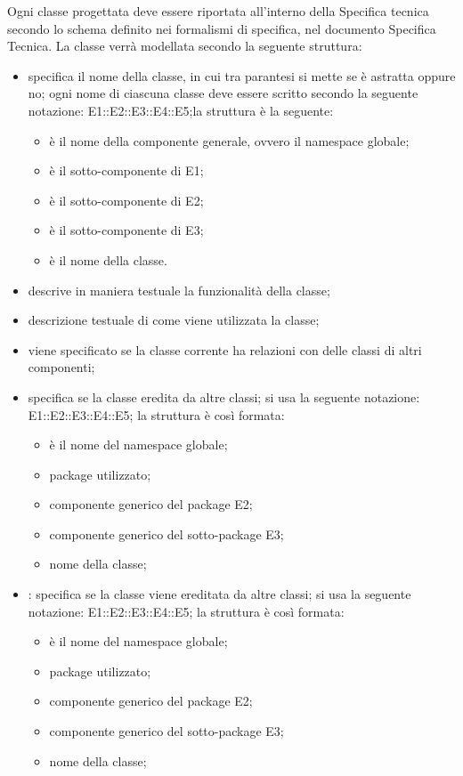 \label{}
Ogni classe progettata deve essere riportata all'interno della Specifica tecnica secondo lo schema definito nei formalismi di specifica, nel documento Specifica Tecnica. La classe verrà modellata secondo la seguente struttura:
\begin{itemize}
\item {}specifica il nome della classe, in cui tra parantesi si mette se è astratta oppure no; ogni nome di ciascuna classe deve essere scritto secondo la seguente notazione: E1::E2::E3::E4::E5;la struttura è la seguente: 
\begin{itemize}
\item {}è il nome della componente generale, ovvero il namespace globale;
\item {}è il sotto-componente di E1;
\item {}è il sotto-componente di E2;
\item {}è il sotto-componente di E3; 
\item {}è il nome della classe.
\end{itemize}
\item {}descrive in maniera testuale la funzionalità della classe;
\item {}descrizione testuale di come viene utilizzata la classe;
\item {}viene specificato se la classe corrente ha relazioni con delle classi di altri componenti;
\item {}specifica se la classe eredita da altre classi; si usa la seguente notazione: E1::E2::E3::E4::E5; la struttura è così formata:
	\begin{itemize}
	\item {}è il nome del namespace globale;
	\item {}package utilizzato;
	\item {}componente generico del package E2;
	\item {}componente generico del sotto-package E3;
	\item {}nome della classe;
	\end{itemize}
\item {}: specifica se la classe viene ereditata da altre classi; si usa la seguente notazione: E1::E2::E3::E4::E5; la struttura è così formata:
	\begin{itemize}
	\item {}è il nome del namespace globale;
	\item {}package utilizzato;
	\item {}componente generico del package E2;
	\item {}componente generico del sotto-package E3;
	\item {}nome della classe;
	\end{itemize}
\end{itemize}

